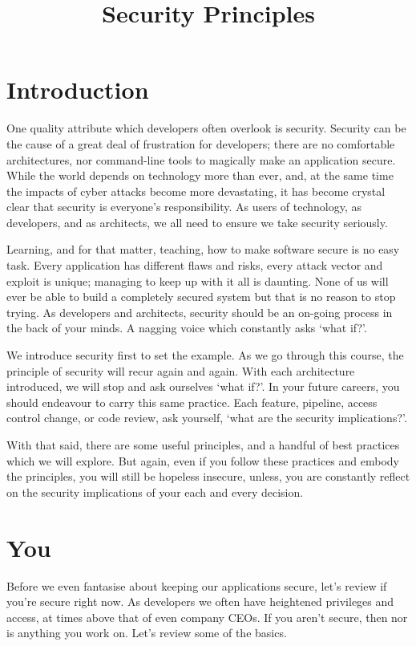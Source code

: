 \title{Security Principles}
\maketitle

\section{Introduction}

One quality attribute which developers often overlook is security.
Security can be the cause of a great deal of frustration for developers;
there are no comfortable architectures, nor command-line tools to magically make an application secure.
While the world depends on technology more than ever, and, at the same time the impacts of cyber attacks become more devastating,
it has become crystal clear that security is everyone's responsibility.
As users of technology, as developers, and as architects, we all need to ensure we take security seriously.

Learning, and for that matter, teaching, how to make software secure is no easy task.
Every application has different flaws and risks, every attack vector and exploit is unique; managing to keep up with it all is daunting.
None of us will ever be able to build a completely secured system but that is no reason to stop trying.
As developers and architects, security should be an on-going process in the back of your minds.
A nagging voice which constantly asks `what if?'.

We introduce security first to set the example.
As we go through this course, the principle of security will recur again and again.
With each architecture introduced, we will stop and ask ourselves `what if?'.
In your future careers, you should endeavour to carry this same practice.
Each feature, pipeline, access control change, or code review, ask yourself, `what are the security implications?'.

With that said, there are some useful principles, and a handful of best practices which we will explore.
But again, even if you follow these practices and embody the principles,
you will still be hopeless insecure, unless,
you are constantly reflect on the security implications of your each and every decision.

\section{You}
Before we even fantasise about keeping our applications secure, let's review if you're secure right now.
As developers we often have heightened privileges and access, at times above that of even company CEOs.
If you aren't secure, then nor is anything you work on.
Let's review some of the basics.

